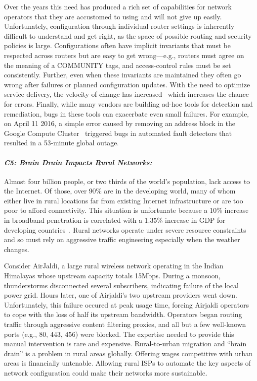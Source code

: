 Over the years this need has produced a rich set of capabilities for network operators that they are accustomed to using and will not give up easily. Unfortunately, configuration through individual router settings is inherently difficult to understand and get right, as the space of possible routing and security policies is large. Configurations often have implicit invariants that must be respected across routers but are easy to get wrong---e.g., routers must agree on the meaning of a COMMUNITY tags, and access-control rules must be set consistently. Further, even when these invariants are maintained they often go wrong after failures or planned configuration updates. With the need to optimize service delivery, the velocity of change has increased~\cite{rameshgoogle} which increases the chance for errors.  Finally, while many vendors are building ad-hoc tools for detection and remediation, bugs in these tools can exacerbate even small failures.  For example, on April 11 2016, a simple error caused by removing an address block in the Google Compute Cluster~\cite{googlefailure} triggered bugs in automated fault detectors that resulted in a 53-minute global outage.

\paragraph*{\em C5: Brain Drain Impacts Rural Networks:} Almost four
billion people, or two thirds of the world’s population, lack access
to the Internet. Of those, over 90\% are in the developing world, many
of whom either live in rural locations far from existing Internet
infrastructure or are too poor to afford connectivity. This situation
is unfortunate because a 10\% increase in broadband penetration is
correlated with a 1.35\% increase in GDP for developing
countries~\cite{perez,qiang}.  Rural networks operate under severe
resource constraints and so must rely on aggressive traffic
engineering especially when the weather changes.

Consider AirJaldi, a large rural wireless network operating in the Indian Himalayas whose upstream capacity totals 15Mbps.  During a monsoon,  thunderstorms disconnected several subscribers, indicating failure of the local power grid. Hours later, one of Airjaldi's two upstream providers went down.  Unfortunately, this failure occured at peak usage time, forcing Airjaldi operators to cope with the loss of half its upstream bandwidth. Operators began routing traffic through aggressive content filtering proxies, and all but a few well-known ports (e.g., 80, 443, 456) were blocked. The expertise needed to provide this manual intervention is rare and expensive.  Rural-to-urban migration and ``brain drain'' is a problem in rural areas globally. Offering wages competitive with urban areas is financially untenable.   Allowing rural ISPs to automate the key aspects of network configuration could make their networks more sustainable.

